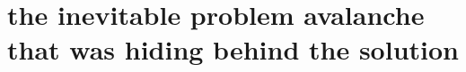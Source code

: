 \documentclass[table,xcolor=dvipsnames,professionalfonts]{beamer}
\begin{document}
\begin{frame}[t]
\end{frame}

\section[the inevitable problem avalanche]{the inevitable problem avalanche that was hiding behind the solution}
\end{document}
